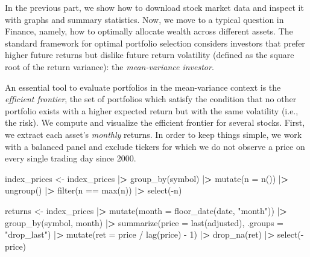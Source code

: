 \documentclass[
]{krantz}
\newenvironment{Shaded}{\begin{snugshade}}{\end{snugshade}}
\newcommand{\AttributeTok}[1]{\textcolor[rgb]{0.61,0.61,0.61}{#1}}
\newcommand{\DecValTok}[1]{\textcolor[rgb]{0.06,0.06,0.06}{#1}}
\newcommand{\ErrorTok}[1]{\textcolor[rgb]{0.14,0.14,0.14}{\textbf{#1}}}
\newcommand{\FunctionTok}[1]{\textcolor[rgb]{0,0,0}{#1}}
\newcommand{\NormalTok}[1]{#1}
\newcommand{\OtherTok}[1]{\textcolor[rgb]{0.37,0.37,0.37}{#1}}
\newcommand{\SpecialCharTok}[1]{\textcolor[rgb]{0,0,0}{#1}}
\newcommand{\StringTok}[1]{\textcolor[rgb]{0.5,0.5,0.5}{#1}}
\begin{document}
In the previous part, we show how to download stock market data and inspect it with graphs and summary statistics. Now, we move to a typical question in Finance, namely, how to optimally allocate wealth across different assets. The standard framework for optimal portfolio selection considers investors that prefer higher future returns but dislike future return volatility (defined as the square root of the return variance): the \emph{mean-variance investor}.

An essential tool to evaluate portfolios in the mean-variance context is the \emph{efficient frontier}, the set of portfolios which satisfy the condition that no other portfolio exists with a higher expected return but with the same volatility (i.e., the risk). We compute and visualize the efficient frontier for several stocks.
First, we extract each asset's \emph{monthly} returns. In order to keep things simple, we work with a balanced panel and exclude tickers for which we do not observe a price on every single trading day since 2000.

\begin{Shaded}
\begin{Highlighting}[]
\NormalTok{index\_prices }\OtherTok{\textless{}{-}}\NormalTok{ index\_prices }\SpecialCharTok{|}\ErrorTok{\textgreater{}}
  \FunctionTok{group\_by}\NormalTok{(symbol) }\SpecialCharTok{|}\ErrorTok{\textgreater{}}
  \FunctionTok{mutate}\NormalTok{(}\AttributeTok{n =} \FunctionTok{n}\NormalTok{()) }\SpecialCharTok{|}\ErrorTok{\textgreater{}}
  \FunctionTok{ungroup}\NormalTok{() }\SpecialCharTok{|}\ErrorTok{\textgreater{}}
  \FunctionTok{filter}\NormalTok{(n }\SpecialCharTok{==} \FunctionTok{max}\NormalTok{(n)) }\SpecialCharTok{|}\ErrorTok{\textgreater{}}
  \FunctionTok{select}\NormalTok{(}\SpecialCharTok{{-}}\NormalTok{n)}

\NormalTok{returns }\OtherTok{\textless{}{-}}\NormalTok{ index\_prices }\SpecialCharTok{|}\ErrorTok{\textgreater{}}
  \FunctionTok{mutate}\NormalTok{(}\AttributeTok{month =} \FunctionTok{floor\_date}\NormalTok{(date, }\StringTok{"month"}\NormalTok{)) }\SpecialCharTok{|}\ErrorTok{\textgreater{}}
  \FunctionTok{group\_by}\NormalTok{(symbol, month) }\SpecialCharTok{|}\ErrorTok{\textgreater{}}
  \FunctionTok{summarize}\NormalTok{(}\AttributeTok{price =} \FunctionTok{last}\NormalTok{(adjusted), }\AttributeTok{.groups =} \StringTok{"drop\_last"}\NormalTok{) }\SpecialCharTok{|}\ErrorTok{\textgreater{}}
  \FunctionTok{mutate}\NormalTok{(}\AttributeTok{ret =}\NormalTok{ price }\SpecialCharTok{/} \FunctionTok{lag}\NormalTok{(price) }\SpecialCharTok{{-}} \DecValTok{1}\NormalTok{) }\SpecialCharTok{|}\ErrorTok{\textgreater{}}
  \FunctionTok{drop\_na}\NormalTok{(ret) }\SpecialCharTok{|}\ErrorTok{\textgreater{}}
  \FunctionTok{select}\NormalTok{(}\SpecialCharTok{{-}}\NormalTok{price)}
\end{Highlighting}
\end{Shaded}
\end{document}
